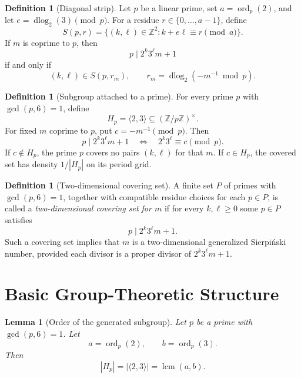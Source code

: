 \documentclass[11pt]{article}
\newtheorem{lemma}[theorem]{Lemma}
\theoremstyle{definition}
\newtheorem{definition}[theorem]{Definition}
\theoremstyle{remark}
\DeclareMathOperator{\ord}{ord}
\DeclareMathOperator{\lcm}{lcm}
\DeclareMathOperator{\dlog}{dlog}
\begin{document}
\begin{definition}[Diagonal strip]
Let \(p\) be a linear prime, set \(a=\ord_p(2)\), and let
\(e=\dlog_2(3)\pmod p\).  For a residue \(r\in\{0,\ldots,a-1\}\), define
\[
        S(p,r)=\{(k,\ell)\in \mathbb Z^2: k+e\ell\equiv r \pmod a\}.
\]
If \(m\) is coprime to \(p\), then
\[
        p\mid 2^k3^\ell m+1
\]
if and only if
\[
        (k,\ell)\in S(p,r_m),
        \qquad
        r_m=\dlog_2(-m^{-1}\bmod p).
\]
\end{definition}

\begin{definition}[Subgroup attached to a prime]
For every prime \(p\) with \(\gcd(p,6)=1\), define
\[
        H_p=\langle 2,3\rangle\subseteq (\mathbb Z/p\mathbb Z)^\times.
\]
For fixed \(m\) coprime to \(p\), put \(c=-m^{-1}\pmod p\).  Then
\[
        p\mid 2^k3^\ell m+1
        \quad\Longleftrightarrow\quad
        2^k3^\ell\equiv c\pmod p.
\]
If \(c\notin H_p\), the prime \(p\) covers no pairs \((k,\ell)\) for that
\(m\).  If \(c\in H_p\), the covered set has density \(1/|H_p|\) on its
period grid.
\end{definition}

\begin{definition}[Two-dimensional covering set]
A finite set \(P\) of primes with \(\gcd(p,6)=1\), together with compatible
residue choices for each \(p\in P\), is called a \emph{two-dimensional covering
set for \(m\)} if for every \(k,\ell\geq 0\) some \(p\in P\) satisfies
\[
        p\mid 2^k3^\ell m+1.
\]
Such a covering set implies that \(m\) is a two-dimensional generalized
Sierpi\'nski number, provided each divisor is a proper divisor of
\(2^k3^\ell m+1\).
\end{definition}

\section{Basic Group-Theoretic Structure}

\begin{lemma}[Order of the generated subgroup]
Let \(p\) be a prime with \(\gcd(p,6)=1\).  Let
\[
        a=\ord_p(2),\qquad b=\ord_p(3).
\]
Then
\[
        |H_p|=|\langle 2,3\rangle|=\lcm(a,b).
\]
\end{lemma}
\end{document}
